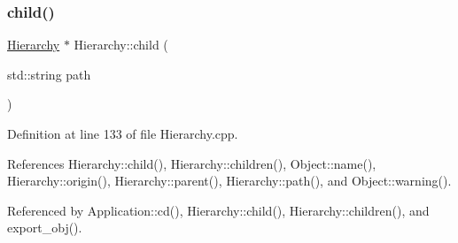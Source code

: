 \subsubsection{\texorpdfstring{child()}{child()}}
{\footnotesize\ttfamily \hyperlink{classHierarchy}{Hierarchy} $\ast$ Hierarchy\+::child (\begin{DoxyParamCaption}\item[{std\+::string}]{path }\end{DoxyParamCaption})\hspace{0.3cm}{\ttfamily [inherited]}}



Definition at line 133 of file Hierarchy.\+cpp.



References Hierarchy\+::child(), Hierarchy\+::children(), Object\+::name(), Hierarchy\+::origin(), Hierarchy\+::parent(), Hierarchy\+::path(), and Object\+::warning().



Referenced by Application\+::cd(), Hierarchy\+::child(), Hierarchy\+::children(), and export\+\_\+obj().


